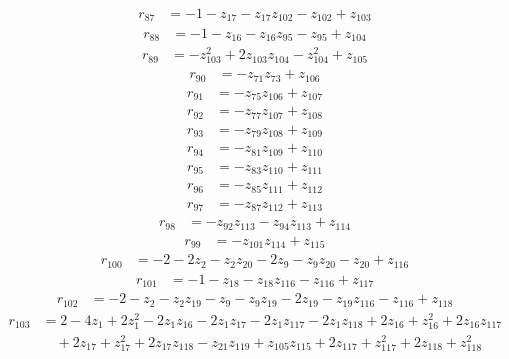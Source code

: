 \begin{align*}
r_{87} &=-1-z_{17}-z_{17}z_{102}-z_{102}+z_{103}
\end{align*}
\begin{align*}
r_{88} &=-1-z_{16}-z_{16}z_{95}-z_{95}+z_{104}
\end{align*}
\begin{align*}
r_{89} &=-z_{103}^{2}+2z_{103}z_{104}-z_{104}^{2}+z_{105}
\end{align*}
\begin{align*}
r_{90} &=-z_{71}z_{73}+z_{106}
\end{align*}
\begin{align*}
r_{91} &=-z_{75}z_{106}+z_{107}
\end{align*}
\begin{align*}
r_{92} &=-z_{77}z_{107}+z_{108}
\end{align*}
\begin{align*}
r_{93} &=-z_{79}z_{108}+z_{109}
\end{align*}
\begin{align*}
r_{94} &=-z_{81}z_{109}+z_{110}
\end{align*}
\begin{align*}
r_{95} &=-z_{83}z_{110}+z_{111}
\end{align*}
\begin{align*}
r_{96} &=-z_{85}z_{111}+z_{112}
\end{align*}
\begin{align*}
r_{97} &=-z_{87}z_{112}+z_{113}
\end{align*}
\begin{align*}
r_{98} &=-z_{92}z_{113}-z_{94}z_{113}+z_{114}
\end{align*}
\begin{align*}
r_{99} &=-z_{101}z_{114}+z_{115}
\end{align*}
\begin{align*}
r_{100} &=-2-2z_{2}-z_{2}z_{20}-2z_{9}-z_{9}z_{20}-z_{20}+z_{116}
\end{align*}
\begin{align*}
r_{101} &=-1-z_{18}-z_{18}z_{116}-z_{116}+z_{117}
\end{align*}
\begin{align*}
r_{102} &=-2-z_{2}-z_{2}z_{19}-z_{9}-z_{9}z_{19}-2z_{19}-z_{19}z_{116}-z_{116}+z_{118}
\end{align*}
\begin{align*}
r_{103} &=2-4z_{1}+2z_{1}^{2}-2z_{1}z_{16}-2z_{1}z_{17}-2z_{1}z_{117}-2z_{1}z_{118}+2z_{16}+z_{16}^{2}+2z_{16}z_{117}\\
&\quad +2z_{17}+z_{17}^{2}+2z_{17}z_{118}-z_{21}z_{119}+z_{105}z_{115}+2z_{117}+z_{117}^{2}+2z_{118}+z_{118}^{2}
\end{align*}
